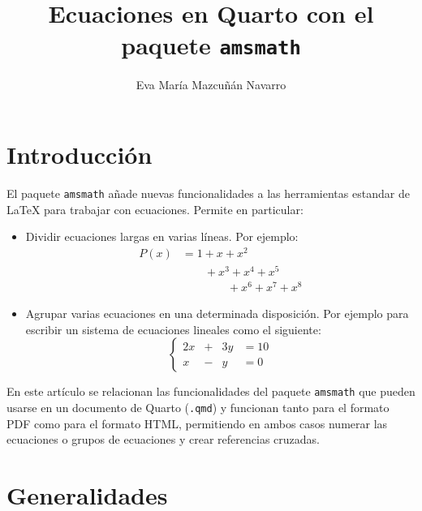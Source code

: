 \documentclass[
  letterpaper,
  DIV=11,
  numbers=noendperiod]{scrartcl}
\title{Ecuaciones en Quarto con el paquete \texttt{amsmath}}
\author{Eva María Mazcuñán Navarro}
\date{}
\providecommand{\tightlist}{%
  \setlength{\itemsep}{0pt}\setlength{\parskip}{0pt}}\usepackage{longtable,booktabs,array}
\renewcommand*\contentsname{Contenidos}
\newcommand\contentsname{Contenidos}
\begin{document}
\maketitle
\ifdefined\Shaded\renewenvironment{Shaded}{\begin{tcolorbox}[enhanced, interior hidden, borderline west={3pt}{0pt}{shadecolor}, breakable, boxrule=0pt, sharp corners, frame hidden]}{\end{tcolorbox}}\fi

\renewcommand*\contentsname{Contenidos}
{
\hypersetup{linkcolor=}
\setcounter{tocdepth}{3}
\tableofcontents
}
\hypertarget{introducciuxf3n}{%
\section{Introducción}\label{introducciuxf3n}}

El paquete \texttt{amsmath} añade nuevas funcionalidades a las
herramientas estandar de LaTeX para trabajar con ecuaciones. Permite en
particular:

\begin{itemize}
\tightlist
\item
  Dividir ecuaciones largas en varias líneas. Por ejemplo: \[
    \begin{split}
    P(x) & = 1  + x + x^2 \\
        & \hspace{2em} + x^3 + x^4 + x^5 \\
        & \hspace{4em} + x^6 + x^7 + x^8
    \end{split}
    \]
\item
  Agrupar varias ecuaciones en una determinada disposición. Por ejemplo
  para escribir un sistema de ecuaciones lineales como el siguiente: \[
    \left\{
    \begin{alignedat}{2} 
    2x & + {}   &  3y  & =  10 \\ 
    x & - {}   &   y  & =  0 
    \end{alignedat}
    \right.
    \]
\end{itemize}

En este artículo se relacionan las funcionalidades del paquete
\texttt{amsmath} que pueden usarse en un documento de Quarto
(\texttt{.qmd}) y funcionan tanto para el formato PDF como para el
formato HTML, permitiendo en ambos casos numerar las ecuaciones o grupos
de ecuaciones y crear referencias cruzadas.

\hypertarget{generalidades}{%
\section{Generalidades}\label{generalidades}}
\end{document}
